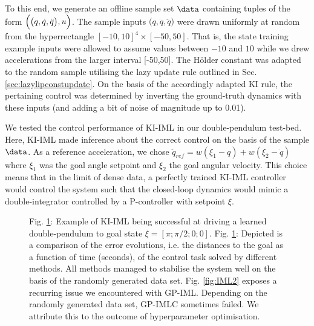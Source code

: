 To this end, we generate an offline sample set $\data$ containing tuples of the form $\Bigl( \bigl(q, \dot q, \ddot q\bigr), u \Bigr) $. The sample inputs $\bigl(q, \dot q, \ddot q\bigr)$ were drawn uniformly at random from the hyperrectangle $[-10,10]^4 \times [-50,50]$. That is, the state training example inputs were allowed to assume values between $-10$ and $10$ while we drew  accelerations from the larger interval [-50,50]. The H\"older constant was adapted to the random sample utilising the lazy update rule outlined in Sec. \ref{sec:lazylipconstupdate}. On the basis of the accordingly adapted KI rule, the pertaining control was determined by inverting the ground-truth dynamics with these inputs (and adding a bit of noise of magnitude up to 0.01). 

We tested the control performance of KI-IML in our double-pendulum test-bed. Here, KI-IML made inference  about the correct control on the basis of the sample $\data$. As a reference acceleration, we chose $\ddot q_{ref} = w(\xi_1 - q) + w (\xi_2 -\dot q)$ where $\xi_1 $ was the goal angle setpoint and $\xi_2$ the goal angular velocity. This choice means that in the limit of dense data, a perfectly trained KI-IML controller would control the system such that the closed-loop dynamics would mimic a double-integrator controlled by a P-controller with setpoint $\xi$.


\begin{figure}
        \centering
%

%


        \caption{Fig. \ref{fig:IML1}: Example of KI-IML being successful at driving a learned double-pendulum to goal state $\xi = [\pi;\pi/2;0;0]$. Fig. \ref{fig:IML1}: Depicted is a comparison of the error evolutions, i.e. the distances to the goal as a function of time (seconds), of the control task solved by different methods. All methods managed to stabilise the system well on the basis of the randomly generated data set. Fig. \ref{fig:IML2} exposes a recurring issue we encountered with GP-IML. Depending on the randomly generated data set, GP-IMLC sometimes failed. We attribute this to the outcome of hyperparameter optimisation.
}
\label{fig:IML1}
\end{figure}	




